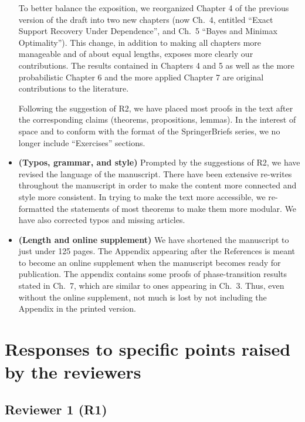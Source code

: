 \documentclass[11pt]{article}
\begin{document}
\begin{itemize}
  To better balance the exposition, we reorganized Chapter 4 of the previous version of the draft into two new chapters (now Ch.\ 4, entitled ``Exact Support Recovery Under Dependence'',  and Ch.\ 5 ``Bayes and Minimax Optimality''). 
  This change, in addition to making all chapters more manageable and of about equal lengths, exposes more clearly our contributions. 
  The results contained in Chapters 4 and 5 as well as the more probabilistic Chapter 6 and the more applied Chapter 7 are original contributions to the literature.
  
  Following the suggestion of R2,  we have placed most proofs in the text after the corresponding claims (theorems, propositions, lemmas).  In the interest of space and to conform with the format of the SpringerBriefs series, we no longer include ``Exercises'' sections. 
  
  \item {\bf (Typos, grammar, and style)}  Prompted by the suggestions of R2, we have revised the language of the manuscript. 
  There have been extensive re-writes throughout the manuscript in order to make the content more connected and style more consistent.  
  In trying to make the text more accessible, we re-formatted the statements of most theorems to make them more modular. 
  We have also corrected typos and missing articles.   
    

 \item {\bf (Length and online supplement)} We have shortened the manuscript to just under 125 pages. The Appendix appearing after the 
 References is meant to become an online supplement when the manuscript becomes ready for publication.  The appendix contains some proofs of phase-transition results stated in Ch.\ 7, which are similar to ones appearing in Ch.\ 3.%
 Thus, even without the online supplement, not much is lost by not including the Appendix in the printed version. 

  
 \end{itemize}
 
 
 \section{Responses to specific points raised by the reviewers}
 
 \subsection{Reviewer 1 (R1)}
 
\end{document}
